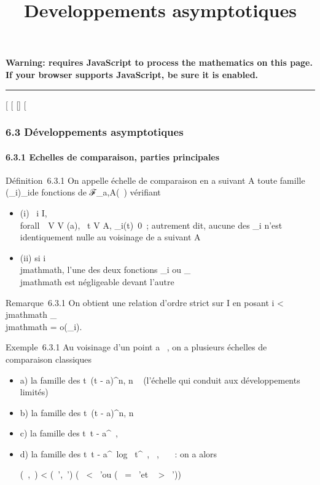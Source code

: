 \documentclass[]{article}
\title{Developpements asymptotiques}
\author{}
\date{}
\begin{document}
\maketitle

\textbf{Warning: 
requires JavaScript to process the mathematics on this page.\\ If your
browser supports JavaScript, be sure it is enabled.}

\begin{center}\rule{3in}{0.4pt}\end{center}

{[}
{[}
{[}{]}
{[}

\subsubsection{6.3 Développements asymptotiques}

\paragraph{6.3.1 Echelles de comparaison, parties principales}

Définition~6.3.1 On appelle échelle de comparaison en a suivant A toute
famille (\phi_i)_i\inI de fonctions de ℱ_a,A(~)
vérifiant

\begin{itemize}
\itemsep1pt\parskip0pt
\item
  (i) \forall~i \in I, \\forall~~V \in V
  (a), \exists~t \in V \bigcap A,
  \phi_i(t)\neq~0~; autrement dit, aucune
  des \phi_i n'est identiquement nulle au voisinage de a suivant A
\item
  (ii) si i\neq~\\jmathmath, l'une des deux fonctions
  \phi_i ou \phi_\\jmathmath est négligeable devant l'autre
\end{itemize}

Remarque~6.3.1 On obtient une relation d'ordre strict sur I en posant i
\textless{} \\jmathmath \Leftrightarrow \phi_\\jmathmath =
o(\phi_i).

Exemple~6.3.1 Au voisinage d'un point a \in {}~, on a plusieurs échelles de
comparaison classiques

\begin{itemize}
\item
  a) la famille des t\mapsto~(t - a)^n, n
  \in {}~ (l'échelle qui conduit aux développements limités)
\item
  b) la famille des t\mapsto~(t - a)^n, n
  \in {}
\item
  c) la famille des t\mapsto~t -
  a^\alpha~, \alpha~ \in {}~
\item
  d) la famille des t\mapsto~t -
  a^\alpha~log~
  t^\beta~, \alpha~,\beta~ \in {}~~: on a alors

  (\alpha~,\beta~) \textless{} (\alpha~',\beta~') \Leftrightarrow
  \bigl (\alpha~ \textless{} \alpha~'\text ou (\alpha~
  = \alpha~'\text et \beta~ \textgreater{}
  \beta~')\bigr )
\end{itemize}
\end{document}
